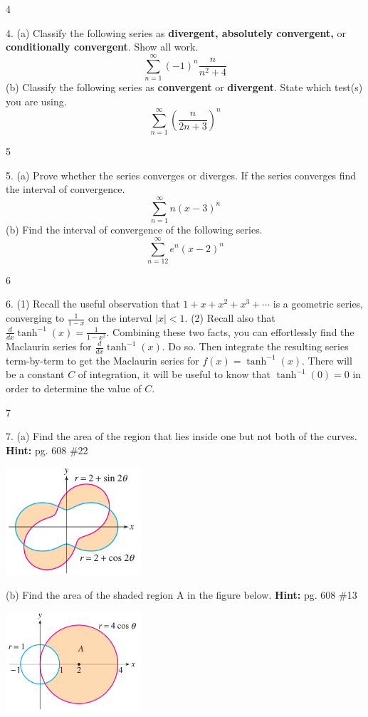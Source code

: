 \documentclass{article}
\begin{document}
\newpage
\begin{flushleft}
4
\end{flushleft}
4. (a) Classify the following series as \textbf{divergent, absolutely convergent,} or \textbf{conditionally convergent}. Show all work.
$$\sum_{n=1}^{\infty} (-1)^n\frac{n}{n^2+4}$$
\vfill
(b) Classify the following series as \textbf{convergent} or \textbf{divergent}. State which test(s) you are using.
$$\sum_{n=1}^{\infty} (\frac{n}{2n+3})^n$$
\vfill

\newpage
\begin{flushright}
5
\end{flushright}
5. (a) Prove whether the series converges or diverges. If the series converges find the interval of convergence. $$\sum_{n=1}^{\infty} n (x-3)^n$$
\vfill
(b) Find the interval of convergence of the following series. $$\sum_{n=12}^{\infty} e^n (x-2)^n$$
\vfill

\newpage
\begin{flushleft}
6
\end{flushleft}
6. (1) Recall the useful observation that $1+x+x^2+x^3+\dotsi$ is a geometric series, converging to $\displaystyle \frac{1}{1-x}$ on the interval $|x| < 1$. (2) Recall also that $\frac{d}{dx}\tanh^{-1}(x) = \frac{1}{1-x^2}$. Combining these two facts, you can effortlessly find the Maclaurin series for $\frac{d}{dx}\tanh^{-1}(x)$. Do so. Then integrate the resulting series term-by-term to get the Maclaurin series for $f(x) = \tanh^{-1}(x)$. There will be a constant $C$ of integration, it will be useful to know that $\tanh^{-1}(0) = 0$ in order to determine the value of $C$.

\newpage
\begin{flushright}
7
\end{flushright}
7. (a) Find the area of the region that lies inside one but not both of the curves. \textbf{Hint:} pg. 608 \#22
\begin{flushright}
\includegraphics[width=5cm,right]{images/CalcTestPicture4.png}
\end{flushright}
\vfill
(b) Find the area of the shaded region A in the figure below. \textbf{Hint:} pg. 608 \#13
\begin{flushright}
\includegraphics[width=5cm,right]{images/CalcTestPicture5.png}
\end{flushright}
\vfill
\end{document}

